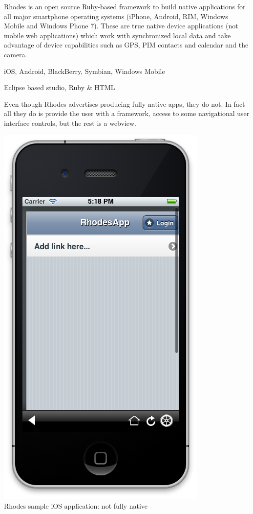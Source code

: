 Rhodes is an open source Ruby-based framework to build native applications for all major smartphone operating systems (iPhone, Android, RIM, Windows Mobile and Windows Phone 7). These are true native device applications (not mobile web applications) which work with synchronized local data and take advantage of device capabilities such as GPS, PIM contacts and calendar and the camera. %

iOS, Android, BlackBerry, Symbian, Windows Mobile

Eclipse based studio, Ruby \& HTML

Even though Rhodes advertises producing fully native apps\cite{RhoMobile}, they do not. In fact all they do is provide the user with a framework, access to some navigational user interface controls, but the rest is a webview.
\begin{centering}
	\includegraphics[scale=0.3]{images/rhodes_notsonative.png}\\{Rhodes sample iOS application: not fully native}\\
\end{centering}

